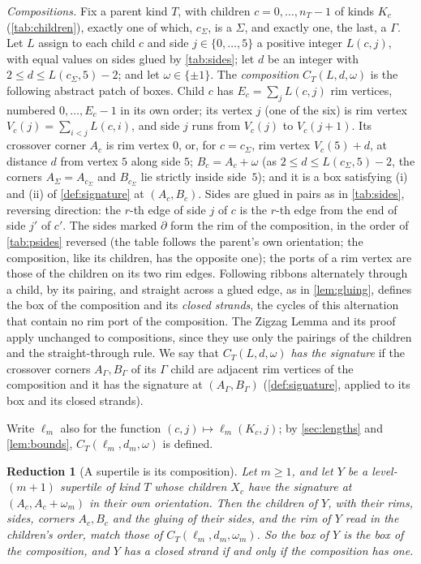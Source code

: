 \documentclass[11pt]{amsart}
\newtheorem*{reduction}{Reduction}
\theoremstyle{definition}
\theoremstyle{remark}
\newcommand{\rim}{\partial}
\begin{document}
\emph{Compositions.} Fix a parent kind $T$, with children $c=0,\dots,n_T-1$ of kinds $K_c$ (\cref{tab:children}),
exactly one of which, $c_\Sigma$, is a $\Sigma$, and exactly one, the last, a $\Gamma$. Let $L$ assign to each child $c$
and side $j\in\{0,\dots,5\}$ a positive integer $L(c,j)$, with equal values on sides glued by \cref{tab:sides}; let $d$
be an integer with $2\le d\le L(c_\Sigma,5)-2$; and let $\omega\in\{\pm1\}$. The \emph{composition} $C_T(L,d,\omega)$
is the following abstract patch of boxes. Child $c$ has $E_c=\sum_jL(c,j)$ rim vertices, numbered $0,\dots,E_c-1$ in
its own order; its vertex $j$ (one of the six) is rim vertex $V_c(j)=\sum_{i<j}L(c,i)$, and side $j$ runs from
$V_c(j)$ to $V_c(j+1)$. Its crossover corner $A_c$ is rim vertex $0$, or, for $c=c_\Sigma$, rim vertex $V_c(5)+d$, at
distance $d$ from vertex $5$ along side $5$; $B_c=A_c+\omega$ (as $2\le d\le L(c_\Sigma,5)-2$, the corners
$A_\Sigma=A_{c_\Sigma}$ and $B_{c_\Sigma}$ lie strictly inside side~$5$); and it is a box satisfying (i) and (ii) of
\cref{def:signature} at $(A_c,B_c)$. Sides are glued in pairs as in \cref{tab:sides}, reversing direction: the $r$-th
edge of side $j$ of $c$ is the $r$-th edge from the end of side $j'$ of $c'$. The sides marked $\rim$ form the rim of
the composition, in the order of \cref{tab:psides} reversed (the table follows the parent's own orientation; the
composition, like its children, has the opposite one); the ports of a rim vertex are those of the children on its two
rim edges. Following ribbons alternately through a child, by its pairing, and straight across a glued edge, as in
\cref{lem:gluing}, defines the box of the composition and its \emph{closed strands}, the cycles of this alternation
that contain no rim port of the composition. The Zigzag Lemma and its proof apply unchanged to compositions, since they
use only the pairings of the children and the straight-through rule. We say that $C_T(L,d,\omega)$ \emph{has the
signature} if the crossover corners $A_\Gamma,B_\Gamma$ of its $\Gamma$ child are adjacent rim vertices of the
composition and it has the signature at $(A_\Gamma,B_\Gamma)$ (\cref{def:signature}, applied to its box and its closed
strands).

Write $\ell_m$ also for the function $(c,j)\mapsto\ell_m(K_c,j)$; by \cref{sec:lengths} and \cref{lem:bounds},
$C_T(\ell_m,d_m,\omega)$ is defined.

\begin{reduction}[A supertile is its composition]
Let $m\ge1$, and let $Y$ be a level-$(m+1)$ supertile of kind $T$ whose children $X_c$ have the signature at
$(A_c,A_c+\omega_m)$ in their own orientation. Then the children of $Y$, with their rims, sides, corners $A_c,B_c$ and
the gluing of their sides, and the rim of $Y$ read in the children's order, match those of
$C_T(\ell_m,d_m,\omega_m)$. So the box of $Y$ is the box of the composition, and $Y$ has a closed strand if and only if
the composition has one.
\end{reduction}
\end{document}
